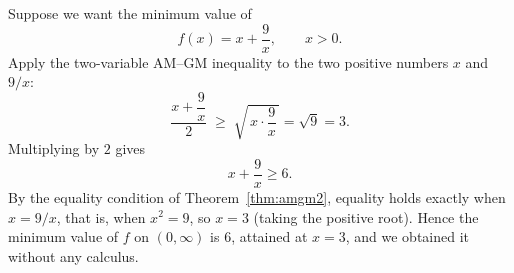 \begin{example}
Suppose we want the minimum value of
\[
f(x) = x + \frac{9}{x}, \qquad x > 0.
\]
Apply the two-variable AM--GM inequality to the two positive numbers $x$ and $9/x$:
\[
\frac{x + \dfrac{9}{x}}{2} \;\geq\; \sqrt{\,x \cdot \frac{9}{x}\,} = \sqrt{9} = 3.
\]
Multiplying by $2$ gives
\[
x + \frac{9}{x} \geq 6.
\]
By the equality condition of Theorem~\ref{thm:amgm2}, equality holds exactly when $x = 9/x$, that is, when $x^2 = 9$, so $x = 3$ (taking the positive root). Hence the minimum value of $f$ on $(0, \infty)$ is $6$, attained at $x = 3$, and we obtained it without any calculus.
\end{example}
